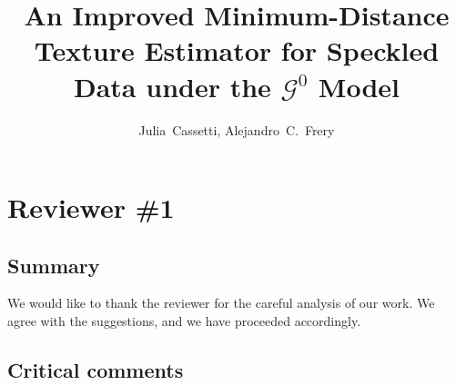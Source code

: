 \documentclass{ar2rc}
\title{An Improved Minimum-Distance Texture Estimator for Speckled Data under the $\mathcal{G}^0$ Model}
\author{Julia~Cassetti,
	Alejandro~C.~Frery}
\begin{document}
	
	\maketitle
	
	\section{Reviewer \#1}
	
	\subsection{Summary}
	
	
	\AR We would like to thank the reviewer for the careful analysis of our work.
	We agree with the suggestions, and we have proceeded accordingly.
	
	\subsection{Critical comments}
	
	
\end{document}
